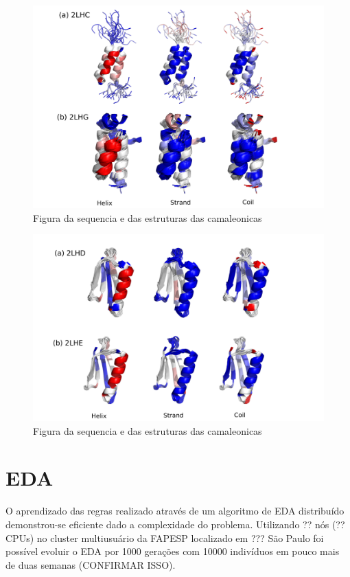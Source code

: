 \begin{figure}
  \centering
  \includegraphics[width=1\textwidth]{figures/camel_2lhc_2lhg.pdf}
  \caption{Figura da sequencia e das estruturas das camaleonicas}
        \label{fig:camel_2lhc_2lhg}
\end{figure}

\begin{figure}
  \centering
  \includegraphics[width=1\textwidth]{figures/camel_2lhd_2lhe.pdf}
  \caption{Figura da sequencia e das estruturas das camaleonicas}
        \label{fig:camel_2lhd_2lhe}
\end{figure}




\section{EDA}

O aprendizado das regras realizado através de um algoritmo de EDA distribuído demonstrou-se eficiente dado a complexidade do problema. Utilizando ?? nós (??CPUs) no cluster multiusuário da FAPESP localizado em ??? São Paulo foi possível evoluir o EDA por 1000 gerações com 10000 indivíduos em pouco mais de duas semanas (CONFIRMAR ISSO).

